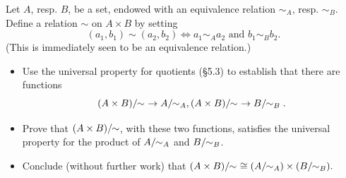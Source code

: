 \begin{problem}[5.11]
	Let $A$, resp. $B$, be a set, endowed with an equivalence relation $\sim_A$,
	resp. $\sim_B$.
	Define a relation $\sim$ on $A\times B$ by setting
	\[ (a_1, b_1) \sim (a_2, b_2) \iff a_1 \sim_A a_2 \text{ and } b_1 \sim_B b_2. \]
	(This is immediately seen to be an equivalence relation.)
	\begin{itemize}
		\item Use the universal property for quotients (\S5.3) to establish that there are
		functions
		\[ \quot{(A\times B)}{\sim} \to \quotntws{A}{\sim_A},
		\quot{(A\times B)}{\sim} \to \quotntws{B}{\sim_B}. \]
		\item Prove that $(A\times B)/\!\!\sim$, with these two functions,
		satisfies the universal property for the product of $A/\!\!\sim_A$ and
		$B/\!\!\sim_B$.
		\item Conclude (without further work) that $(A\times
			B)/\!\!\sim\,\,\cong(A/\!\!\sim_A)\times(B/\!\!\sim_B).$
	\end{itemize}
\end{problem}
